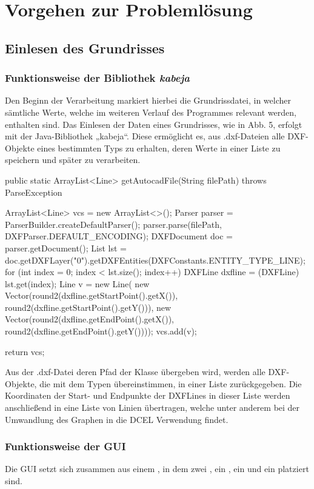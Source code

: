 \chapter{Vorgehen zur Problemlösung}
\section{Einlesen des Grundrisses}

\subsection{Funktionsweise der Bibliothek \textit{kabeja}}
Den Beginn der Verarbeitung markiert hierbei die Grundrissdatei, in welcher sämtliche Werte, welche im weiteren Verlauf des Programmes relevant werden, enthalten sind.
Das Einlesen der Daten eines Grundrisses, wie in Abb. 5, erfolgt mit der Java-Bibliothek „kabeja“. 
Diese ermöglicht es, aus .dxf-Dateien alle DXF-Objekte eines bestimmten Typs zu erhalten, deren Werte in einer Liste zu speichern und später zu verarbeiten.
\begin{code}
public static ArrayList<Line> getAutocadFile(String filePath) throws ParseException {
	ArrayList<Line> vcs = new ArrayList<>();
	Parser parser = ParserBuilder.createDefaultParser();
	parser.parse(filePath, DXFParser.DEFAULT_ENCODING);
	DXFDocument doc = parser.getDocument();
	List lst = doc.getDXFLayer("0").getDXFEntities(DXFConstants.ENTITY_TYPE_LINE);
	for (int index = 0; index < lst.size(); index++) {
		DXFLine dxfline = (DXFLine) lst.get(index);
		Line v = new Line(
		new Vector(round2(dxfline.getStartPoint().getX()), round2(dxfline.getStartPoint().getY())),
		new Vector(round2(dxfline.getEndPoint().getX()), round2(dxfline.getEndPoint().getY())));
		vcs.add(v);
	}
	
	return vcs;
}
\end{code}


Aus der .dxf-Datei deren Pfad der Klasse  übergeben wird, werden alle DXF-Objekte, die mit dem Typen  übereinstimmen, in einer Liste zurückgegeben. 
Die Koordinaten der Start- und Endpunkte der DXFLines  in dieser Liste werden anschließend in eine Liste von Linien übertragen, welche unter anderem bei der Umwandlung des Graphen in die DCEL Verwendung findet.

\subsection{Funktionsweise der GUI}
Die GUI setzt sich zusammen aus einem , in dem zwei , ein , ein  und ein  platziert sind.

